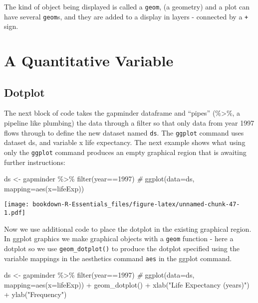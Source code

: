 \documentclass[
]{book}
\newenvironment{Shaded}{\begin{snugshade}}{\end{snugshade}}
\newcommand{\AttributeTok}[1]{\textcolor[rgb]{0.77,0.63,0.00}{#1}}
\newcommand{\CommentTok}[1]{\textcolor[rgb]{0.56,0.35,0.01}{\textit{#1}}}
\newcommand{\DecValTok}[1]{\textcolor[rgb]{0.00,0.00,0.81}{#1}}
\newcommand{\FunctionTok}[1]{\textcolor[rgb]{0.00,0.00,0.00}{#1}}
\newcommand{\NormalTok}[1]{#1}
\newcommand{\OtherTok}[1]{\textcolor[rgb]{0.56,0.35,0.01}{#1}}
\newcommand{\SpecialCharTok}[1]{\textcolor[rgb]{0.00,0.00,0.00}{#1}}
\newcommand{\StringTok}[1]{\textcolor[rgb]{0.31,0.60,0.02}{#1}}
\begin{document}
The kind of object being displayed is called a \texttt{geom}, (a geometry) and a plot can have several \texttt{geom}s, and they are added to a display in layers - connected by a \texttt{+} sign.

\hypertarget{a-quantitative-variable}{%
\section{A Quantitative Variable}\label{a-quantitative-variable}}

\hypertarget{dotplot}{%
\subsection{Dotplot}\label{dotplot}}

The next block of code takes the gapminder dataframe and ``pipes'' (\%\textgreater\%, a pipeline like plumbing) the data through a filter so that only data from year 1997 flows through to define the new dataset named \texttt{ds}. The \texttt{ggplot} command uses dataset ds, and variable x life expectancy. The next example shows what using only the \texttt{ggplot} command produces an empty graphical region that is awaiting further instructions:

\begin{Shaded}
\begin{Highlighting}[]
\NormalTok{ds }\OtherTok{\textless{}{-}}\NormalTok{ gapminder }\SpecialCharTok{\%\textgreater{}\%} \FunctionTok{filter}\NormalTok{(year}\SpecialCharTok{==}\DecValTok{1997}\NormalTok{) }
\CommentTok{\#}
\FunctionTok{ggplot}\NormalTok{(}\AttributeTok{data=}\NormalTok{ds, }\AttributeTok{mapping=}\FunctionTok{aes}\NormalTok{(}\AttributeTok{x=}\NormalTok{lifeExp)) }
\end{Highlighting}
\end{Shaded}

\texttt{[image: bookdown-R-Essentials\_files/figure-latex/unnamed-chunk-47-1.pdf]}

Now we use additional code to place the dotplot in the existing graphical region. In ggplot graphics we make graphical objects with a \texttt{geom} function - here a dotplot so we use \texttt{geom\_dotplot()} to produce the dotplot specified using the variable mappings in the aesthetics command \texttt{aes} in the ggplot command.

\begin{Shaded}
\begin{Highlighting}[]
\NormalTok{ds }\OtherTok{\textless{}{-}}\NormalTok{ gapminder }\SpecialCharTok{\%\textgreater{}\%} \FunctionTok{filter}\NormalTok{(year}\SpecialCharTok{==}\DecValTok{1997}\NormalTok{) }
\CommentTok{\#}
\FunctionTok{ggplot}\NormalTok{(}\AttributeTok{data=}\NormalTok{ds, }\AttributeTok{mapping=}\FunctionTok{aes}\NormalTok{(}\AttributeTok{x=}\NormalTok{lifeExp)) }\SpecialCharTok{+} 
  \FunctionTok{geom\_dotplot}\NormalTok{() }\SpecialCharTok{+} 
  \FunctionTok{xlab}\NormalTok{(}\StringTok{"Life Expectancy (years)"}\NormalTok{) }\SpecialCharTok{+} \FunctionTok{ylab}\NormalTok{(}\StringTok{"Frequency"}\NormalTok{)}
\end{Highlighting}
\end{Shaded}
\end{document}

